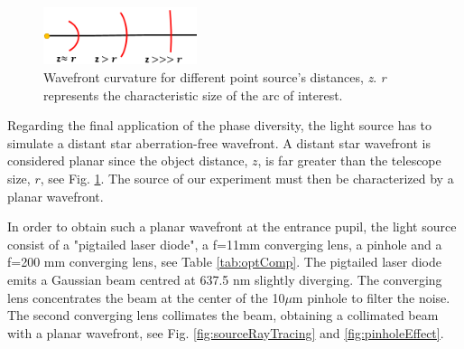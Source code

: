 \begin{minipage}{\linewidth}
\begin{figure}
\centering
\includegraphics[width=0.4\textwidth]{Figures/WFdistantSource.PNG}
\decoRulewrapFig
\caption[Wavefront curvature]{Wavefront curvature for different point source's distances, \textit{z}. \textit{r} represents the characteristic size of the arc of interest.}
\label{fig:WFdistantSource}
\end{figure}

Regarding the final application of the phase diversity, the light source has to simulate a distant star aberration-free wavefront. A distant star wavefront is considered planar since the object distance, $z$, is far greater than the telescope size, $r$, see Fig. \ref{fig:WFdistantSource}. The source of our experiment must then be characterized by a planar wavefront.

In order to obtain such a planar wavefront at the entrance pupil, the light source consist of a "pigtailed laser diode", a f=11mm converging lens, a pinhole and a f=200 mm converging lens, see Table \ref{tab:optComp}. The pigtailed laser diode emits a Gaussian beam centred at 637.5 nm slightly diverging. The converging lens concentrates the beam at the center of the 10$\mu$m pinhole to filter the noise. The second converging lens collimates the beam, obtaining a collimated beam with a planar wavefront, see Fig. \ref{fig:sourceRayTracing} and \ref{fig:pinholeEffect}.

\end{minipage}

